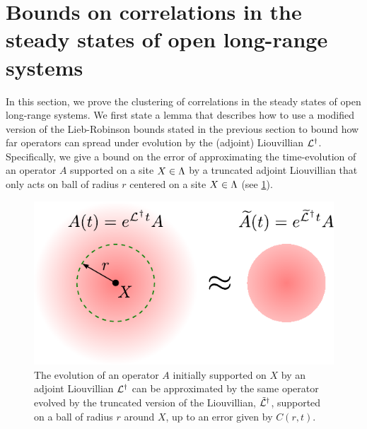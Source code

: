 \section{Bounds on correlations in the steady states of open long-range systems}
\label{sec:clustering-of-correlations}
In this section, we prove the clustering of correlations in the steady states of open long-range systems.
We first state a lemma that describes how to use a modified version of the Lieb-Robinson bounds stated in the previous section to bound how far operators can spread under evolution by the (adjoint) Liouvillian $\mathcal{L}^\dagger$.
Specifically, we give a bound on the error of approximating the time-evolution of an operator $A$ supported on a site $X\in\Lambda$ by a truncated adjoint Liouvillian that only acts on ball of radius $r$ centered on a site $X\in\Lambda$ (see \cref{fig:LRbound_truncated}).

\begin{figure}
\centering
  \includegraphics[scale=0.875]{figures/truncate.pdf}
  \caption[Evolution by truncated Liouvillian]{The evolution of an operator $A$ initially supported on $X$ by an adjoint Liouvillian $\mathcal{L}^\dag$ can be approximated by the same operator evolved by the truncated version of the Liouvillian, $\tilde {\mathcal{L}}^\dag$, supported on a ball of radius $r$ around $X$, up to an error given by $C(r,t)$.}
  \label{fig:LRbound_truncated}
\end{figure}


